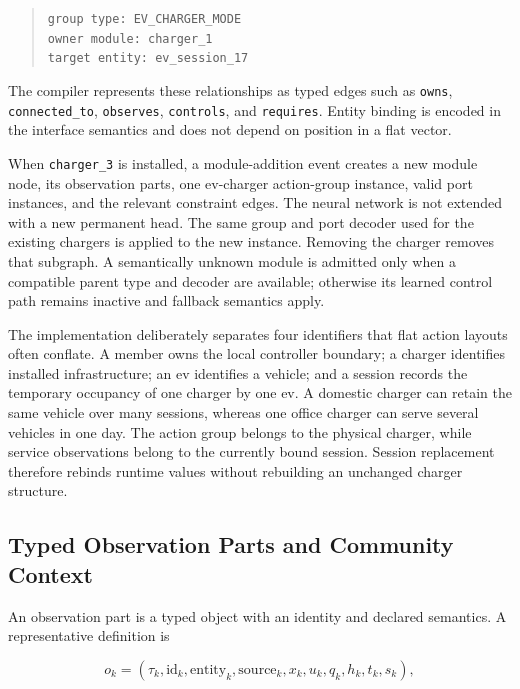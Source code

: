 \begin{quote}\small
\begin{minipage}{\linewidth}
\texttt{group type: EV\_CHARGER\_MODE}\\
\texttt{owner module: charger\_1}\\
\texttt{target entity: ev\_session\_17}
\end{minipage}
\end{quote}

The compiler represents these relationships as typed edges such as \texttt{owns}, \texttt{connected\_to}, \texttt{observes}, \texttt{controls}, and \texttt{requires}. Entity binding is encoded in the interface semantics and does not depend on position in a flat vector.

When \texttt{charger\_3} is installed, a module-addition event creates a new module node, its observation parts, one \gls{ev}-charger action-group instance, valid port instances, and the relevant constraint edges. The neural network is not extended with a new permanent head. The same group and port decoder used for the existing chargers is applied to the new instance. Removing the charger removes that subgraph. A semantically unknown module is admitted only when a compatible parent type and decoder are available; otherwise its learned control path remains inactive and fallback semantics apply.

The implementation deliberately separates four identifiers that flat action layouts often conflate. A member owns the local controller boundary; a charger identifies installed infrastructure; an \gls{ev} identifies a vehicle; and a session records the temporary occupancy of one charger by one \gls{ev}. A domestic charger can retain the same vehicle over many sessions, whereas one office charger can serve several vehicles in one day. The action group belongs to the physical charger, while service observations belong to the currently bound session. Session replacement therefore rebinds runtime values without rebuilding an unchanged charger structure.

\subsection{Typed Observation Parts and Community Context}
\label{sec:timarl-observations}

An observation part is a typed object with an identity and declared semantics. A representative definition is

\begin{equation}
o_k
=
\left(
\tau_k,
\mathrm{id}_k,
\mathrm{entity}_k,
\mathrm{source}_k,
 x_k,
 u_k,
 q_k,
 h_k,
 t_k,
 s_k
\right),
\label{eq:observation-part}
\end{equation}

